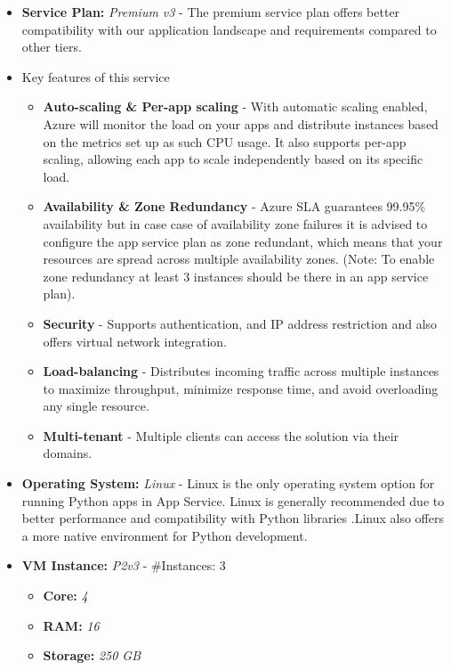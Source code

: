 \documentclass{llncs}
\begin{document}
\begin{itemize}
    \item \textbf{Service Plan:} \textit{Premium v3} - The premium service plan offers better compatibility with our application landscape and requirements compared to other tiers.
    \item Key features of this service
          \begin{itemize}
              \item \textbf{Auto-scaling \& Per-app scaling} - With automatic scaling enabled, Azure will monitor the load on your apps and distribute instances based on the metrics set up as such CPU usage. It also supports per-app scaling, allowing each app to scale independently based on its specific load.
              \item \textbf{Availability \& Zone Redundancy} - Azure SLA guarantees 99.95\% availability but in case case of availability zone failures it is advised to configure the app service plan as zone redundant, which means that your resources are spread across multiple availability zones. (Note: To enable zone redundancy at least 3 instances should be there in an app service plan).
              \item \textbf{Security} - Supports authentication, and IP address restriction and also offers virtual network integration.
              \item \textbf{Load-balancing} - Distributes incoming traffic across multiple instances to maximize throughput, minimize response time, and avoid overloading any single resource.
              \item \textbf{Multi-tenant} - Multiple clients can access the solution via their domains.
          \end{itemize}

    \item \textbf{Operating System:} \textit{Linux} - Linux is the only operating system option for running Python apps in App Service. Linux is generally recommended due to better performance and compatibility with Python libraries
          .Linux also offers a more native environment for Python development\cite{MicrosoftAzurePythonConfig}.

    \item \textbf{VM Instance:} \textit{P2v3} - \#Instances: 3

          \begin{itemize}
              \item \textbf{Core:} \textit{4}
              \item \textbf{RAM:} \textit{16}
              \item \textbf{Storage:} \textit{250 GB}
          \end{itemize}
\end{itemize}
\end{document}
